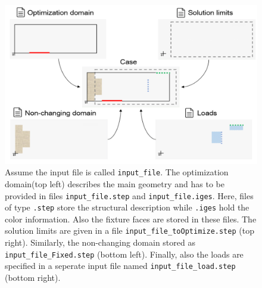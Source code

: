\begin{figure}
\includegraphics[width=\textwidth]{Pictures/four_files.png}
\caption{Assume the input file is called \texttt{input{\_}file}. The optimization domain(top left) describes the main geometry and has to be provided in files \texttt{input{\_}file.step} and \texttt{input{\_}file.iges}. Here, files of type \texttt{.step} store the structural description while \texttt{.iges} hold the color information. Also the fixture faces are stored in these files. The solution limits are given in a file \texttt{input{\_}file{\_}toOptimize.step} (top right). Similarly, the non-changing domain stored as \texttt{input{\_}file{\_}Fixed.step} (bottom left). Finally, also the loads are specified in a seperate input file named \texttt{input{\_}file{\_}load.step} (bottom right).}
\label{fig: CADTopInputFiles}
\end{figure}
